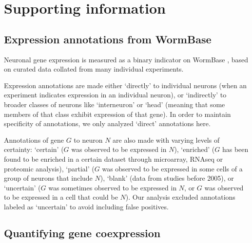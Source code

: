 \documentclass[10pt,letterpaper]{article}
\begin{document}



\newpage
\section*{Supporting information}
\setcounter{figure}{0} \renewcommand{\thefigure}{S\arabic{figure}}
\renewcommand{\thefigure}{S\arabic{figure}}

\subsection*{Expression annotations from WormBase}

Neuronal gene expression is measured as a binary indicator on WormBase \cite{Harris:2009kd}, based on curated data collated from many individual experiments.

Expression annotations are made either `directly' to individual neurons (when an experiment indicates expression in an individual neuron), or `indirectly' to broader classes of neurons like `interneuron' or `head' (meaning that some members of that class exhibit expression of that gene).
In order to maintain specificity of annotations, we only analyzed `direct' annotations here.

Annotations of gene $G$ to neuron $N$ are also made with varying levels of certainty:
`certain' ($G$ was observed to be expressed in $N$),
`enriched' ($G$ has been found to be enriched in a certain dataset through microarray, RNAseq or proteomic analysis),
`partial' ($G$ was observed to be expressed in some cells of a group of neurons that include $N$),
`blank' (data from studies before 2005),
or `uncertain' ($G$ was sometimes observed to be expressed in $N$, or $G$ was observed to be expressed in a cell that could be $N$).
Our analysis excluded annotations labeled as `uncertain' to avoid including false positives.

\subsection*{Quantifying gene coexpression}
\end{document}
